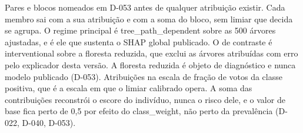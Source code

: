 \begin{flushleft}
\footnotesize Pares e blocos nomeados em D-053 antes de qualquer atribuição existir. Cada membro sai com a sua atribuição e com a soma do bloco, sem limiar que decida se agrupa. O regime principal é tree\_path\_dependent sobre as 500 árvores ajustadas, e é ele que sustenta o SHAP global publicado. O de contraste é interventional sobre a floresta reduzida, que exclui as árvores atribuídas com erro pelo explicador desta versão. A floresta reduzida é objeto de diagnóstico e nunca modelo publicado (D-053). Atribuições na escala de fração de votos da classe positiva, que é a escala em que o limiar calibrado opera. A soma das contribuições reconstrói o escore do indivíduo, nunca o risco dele, e o valor de base fica perto de 0,5 por efeito do class\_weight, não perto da prevalência (D-022, D-040, D-053).
\end{flushleft}
